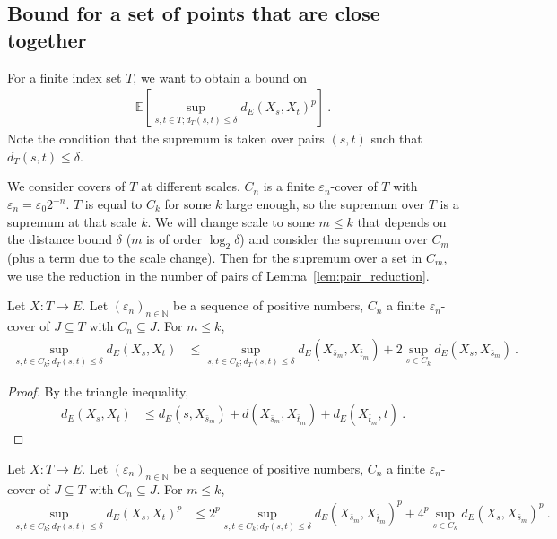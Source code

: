 \subsection{Bound for a set of points that are close together}

For a finite index set $T$, we want to obtain a bound on
\begin{align*}
  \mathbb{E}\left[ \sup_{s, t \in T; d_T(s, t) \le \delta} d_E(X_s, X_t)^p \right] \: .
\end{align*}
Note the condition that the supremum is taken over pairs $(s, t)$ such that $d_T(s, t) \le \delta$.

We consider covers of $T$ at different scales. $C_n$ is a finite $\varepsilon_n$-cover of $T$ with $\varepsilon_n = \varepsilon_0 2^{-n}$.
$T$ is equal to $C_k$ for some $k$ large enough, so the supremum over $T$ is a supremum at that scale $k$.
We will change scale to some $m \le k$ that depends on the distance bound $\delta$ ($m$ is of order $\log_2 \delta$) and consider the supremum over $C_m$ (plus a term due to the scale change).
Then for the supremum over a set in $C_m$, we use the reduction in the number of pairs of Lemma~\ref{lem:pair_reduction}.

\begin{lemma}\label{lem:scale_change}
  \leanok
Let $X : T \to E$.
Let $(\varepsilon_n)_{n \in \mathbb{N}}$ be a sequence of positive numbers, $C_n$ a finite $\varepsilon_n$-cover of $J \subseteq T$ with $C_n \subseteq J$.
For $m \le k$,
\begin{align*}
  \sup_{s, t \in C_k; d_T(s, t) \le \delta} d_E(X_s, X_t)
  &\le \sup_{s, t \in C_k; d_T(s, t) \le \delta} d_E(X_{\bar{s}_m}, X_{\bar{t}_m})
    + 2 \sup_{s \in C_k} d_E(X_s, X_{\bar{s}_m})
  \: .
\end{align*}
\end{lemma}

\begin{proof}
By the triangle inequality,
\begin{align*}
  d_E(X_s, X_t)
  &\le d_E(s, X_{\bar{s}_m}) + d(X_{\bar{s}_m}, X_{\bar{t}_m}) + d_E(X_{\bar{t}_m}, t)
  \: .
\end{align*}
\end{proof}


\begin{corollary}\label{cor:scale_change_rpow}
  \leanok
Let $X : T \to E$.
Let $(\varepsilon_n)_{n \in \mathbb{N}}$ be a sequence of positive numbers, $C_n$ a finite $\varepsilon_n$-cover of $J \subseteq T$ with $C_n \subseteq J$.
For $m \le k$,
\begin{align*}
  \sup_{s, t \in C_k; d_T(s, t) \le \delta} d_E(X_s, X_t)^p
  &\le 2^p \sup_{s, t \in C_k; d_T(s, t) \le \delta} d_E(X_{\bar{s}_m}, X_{\bar{t}_m})^p
    + 4^p \sup_{s \in C_k} d_E(X_s, X_{\bar{s}_m})^p
  \: .
\end{align*}
\end{corollary}

